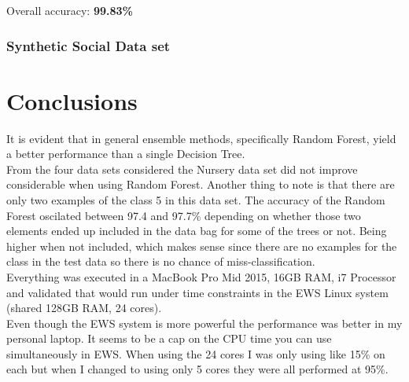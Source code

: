 \documentclass[11pt]{article}
\begin{document}
Overall accuracy: \textbf{99.83\%}

\subsubsection*{Synthetic Social Data set}

\section*{Conclusions}

It is evident that in general ensemble methods, specifically Random Forest, yield a better performance than a single Decision Tree. \\

From the four data sets considered the Nursery data set did not improve considerable when using Random Forest. Another thing to note is that there are only two examples of the class 5 in this data set. The accuracy of the Random Forest oscilated between 97.4 and 97.7\% depending on whether those two elements ended up included in the data bag for some of the trees or not. Being higher when not included, which makes sense since there are no examples for the class in the test data so there is no chance of miss-classification. \\

Everything was executed in a MacBook Pro Mid 2015, 16GB RAM, i7 Processor and validated that would run under time constraints in the EWS Linux system (shared 128GB RAM, 24 cores). \\Even though the EWS system is more powerful the performance was better in my personal laptop. It seems to be a cap on the CPU time you can use simultaneously in EWS. When using the 24 cores I was only using like 15\% on each but when I changed to using only 5 cores they were all performed at 95\%. 
\end{document}
